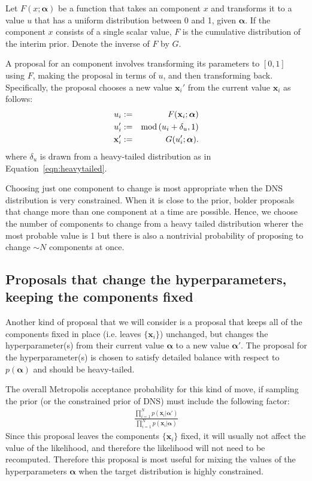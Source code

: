 \documentclass[letterpaper, 11pt]{article}
\newcommand{\hyperparams}{\boldsymbol{\alpha}}
\newcommand{\xx}{\mathbf{x}}
\begin{document}
Let $F(x; \hyperparams)$ be a function that takes an component $x$ and transforms it
to a value $u$ that has a uniform distribution between 0 and 1, given $\hyperparams$.
If the component $x$ consists of a single scalar value, $F$ is the cumulative
distribution of the interim prior. Denote the inverse of $F$ by $G$.

A proposal
for an component involves transforming its parameters to $[0, 1]$ using $F$,
making the proposal in terms of $u$, and then transforming back.
Specifically, the proposal chooses
a new value $\xx_i'$ from the current value $\xx_i$ as follows:
\begin{eqnarray}
u_i &:=& F(\xx_i; \hyperparams)\\
u_i' &:=& \textnormal{mod}\left(u_i + \delta_u, 1\right)\\
\xx_i' &:=& G(u_i'; \hyperparams).
\end{eqnarray}
where $\delta_u$ is drawn from a heavy-tailed distribution as in
Equation~\ref{eqn:heavytailed}.

Choosing just one component to change is most appropriate when the DNS
distribution is very constrained. When it is close to the prior, bolder
proposals that change more than one component at a time are possible. Hence,
we choose the number of components to change from a heavy tailed distribution
wherer the most probable value is 1 but there is also a nontrivial probability
of proposing to change $\sim N$ components at once.

\subsection{Proposals that change the hyperparameters,
keeping the components fixed}\label{sec:proposal3}
Another kind of proposal that we will consider is a proposal that keeps all of
the components fixed in place (i.e. leaves $\{\xx_i\}$) unchanged, but changes
the hyperparameter(s) from their current value $\hyperparams$
to a new value $\hyperparams'$. The proposal for the hyperparameter(s) is chosen
to satisfy detailed balance with respect to $p(\hyperparams)$ and should be
heavy-tailed.

The overall Metropolis acceptance probability
for this kind of move, if sampling the prior (or the constrained prior of DNS)
must include the following factor:
\begin{eqnarray}
\frac{\prod_{i=1}^N p(\xx_i | \hyperparams')}{\prod_{i=1}^N p(\xx_i | \hyperparams)}
\label{eqn:acceptance_prob}
\end{eqnarray}
Since this proposal leaves the components $\{\xx_i\}$ fixed, it will usually not
affect the value of the likelihood, and therefore the likelihood will not need
to be recomputed. Therefore this proposal is most useful for mixing the values
of the hyperparameters $\hyperparams$ when the target distribution is highly
constrained.
\end{document}
